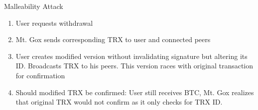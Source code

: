 \documentclass[]{beamer}
\begin{document}
\begin{frame}{Malleability Attack}
\begin{enumerate}
 \item User requests withdrawal
 \item Mt. Gox sends corresponding TRX to user and connected peers
 \item User creates modified version without invalidating signature but altering its ID. Broadcasts TRX to his peers. This version races with original transaction for confirmation
 \item Should modified TRX be confirmed: User still receives BTC, Mt. Gox realizes that original TRX would not confirm as it only checks for TRX ID.
\end{enumerate}
\centering
\begin{tikzpicture}[squarednode/.style = {rectangle, draw=black!60, fill=black!5}]
	

\end{tikzpicture}
\end{frame}
\end{document}

